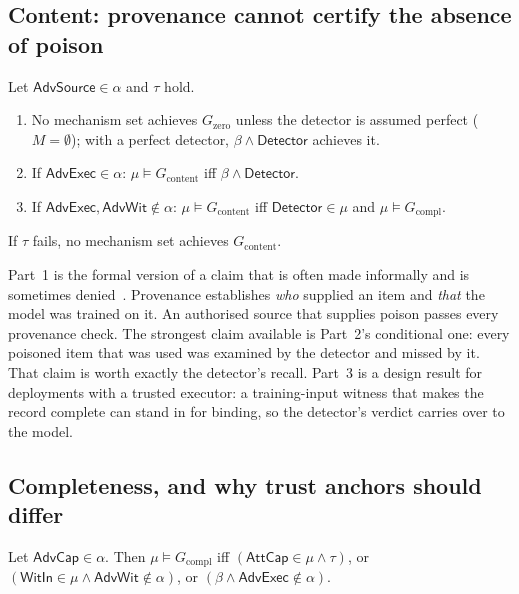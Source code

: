 \subsection{Content: provenance cannot certify the absence of poison}

\begin{theorem}[Content]\label{thm:content}
Let $\textsf{AdvSource}\in\alpha$ and $\tau$ hold.
\begin{enumerate}
\item No mechanism set achieves $G_{\mathrm{zero}}$ unless the detector is assumed perfect
  ($M=\emptyset$); with a perfect detector, $\beta\wedge\textsf{Detector}$ achieves it.
\item If $\textsf{AdvExec}\in\alpha$: $\mu\models G_{\mathrm{content}}$ iff $\beta\wedge\textsf{Detector}$.
\item If $\textsf{AdvExec},\textsf{AdvWit}\notin\alpha$: $\mu\models G_{\mathrm{content}}$ iff
  $\textsf{Detector}\in\mu$ and $\mu\models G_{\mathrm{compl}}$.
\end{enumerate}
If $\tau$ fails, no mechanism set achieves $G_{\mathrm{content}}$.
\end{theorem}

Part~1 is the formal version of a claim that is often made informally and is sometimes
denied~\cite{stokes2021prevent}. Provenance establishes \emph{who} supplied an item and
\emph{that} the model was trained on it. An authorised source that supplies poison passes
every provenance check. The strongest claim available is Part~2's conditional one: every
poisoned item that was used was examined by the detector and missed by it. That claim is
worth exactly the detector's recall. Part~3 is a design result for deployments with a
trusted executor: a training-input witness that makes the record complete can stand in for
binding, so the detector's verdict carries over to the model.

\subsection{Completeness, and why trust anchors should differ}

\begin{theorem}[Completeness]\label{thm:compl}
Let $\textsf{AdvCap}\in\alpha$. Then $\mu\models G_{\mathrm{compl}}$ iff
$(\textsf{AttCap}\in\mu\wedge\tau)$, or $(\textsf{WitIn}\in\mu\wedge\textsf{AdvWit}\notin\alpha)$,
or $(\beta\wedge\textsf{AdvExec}\notin\alpha)$.
\end{theorem}

